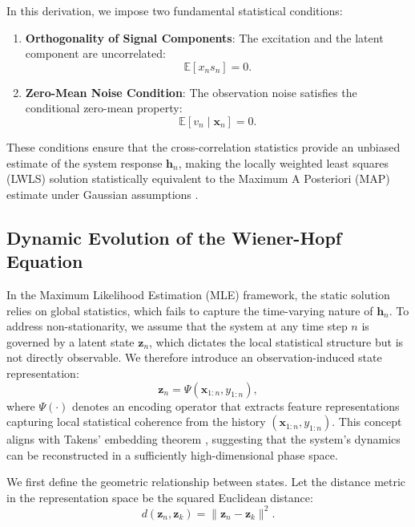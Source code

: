 \documentclass[conference]{IEEEtran}
\begin{document}
In this derivation, we impose two fundamental statistical conditions:
\begin{enumerate}
    \item \textbf{Orthogonality of Signal Components}: The excitation and the latent component are uncorrelated:
    \begin{equation}
    \mathbb{E}[x_n s_n] = 0.
    \end{equation}
    \item \textbf{Zero-Mean Noise Condition}: The observation noise satisfies the conditional zero-mean property:
    \begin{equation}
    \mathbb{E}[v_n \mid \mathbf{x}_n] = 0.
    \end{equation}
\end{enumerate}

These conditions ensure that the cross-correlation statistics provide an unbiased estimate of the system response $\mathbf{h}_n$, making the locally weighted least squares (LWLS) solution statistically equivalent to the Maximum A Posteriori (MAP) estimate under Gaussian assumptions \cite{widrow1985}.

\subsection{Dynamic Evolution of the Wiener-Hopf Equation}
In the Maximum Likelihood Estimation (MLE) framework, the static solution relies on global statistics, which fails to capture the time-varying nature of $\mathbf{h}_n$. To address non-stationarity, we assume that the system at any time step $n$ is governed by a latent state $\mathbf{z}_n$, which dictates the local statistical structure but is not directly observable. We therefore introduce an observation-induced state representation:
\begin{equation}
\mathbf{z}_n = \Psi(\mathbf{x}_{1:n}, y_{1:n}),
\label{eq:state_embedding}
\end{equation}
where $\Psi(\cdot)$ denotes an encoding operator that extracts feature representations capturing local statistical coherence from the history $(\mathbf{x}_{1:n}, y_{1:n})$. This concept aligns with Takens' embedding theorem \cite{takens1981}, suggesting that the system's dynamics can be reconstructed in a sufficiently high-dimensional phase space.

We first define the geometric relationship between states. Let the distance metric in the representation space be the squared Euclidean distance:
\begin{equation}
d(\mathbf{z}_n, \mathbf{z}_k) = \|\mathbf{z}_n - \mathbf{z}_k\|^2.
\end{equation}
\end{document}

